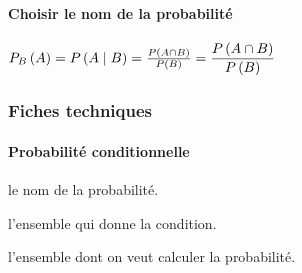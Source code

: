 \documentclass[12pt,a4paper]{article}
\begin{document}
\paragraph{Choisir le nom de la probabilité}

\begin{latexex}
$\probacond[P]{B}{A}
 =
 \probacond*[P]{B}{A}
 =
 \probacond**[P]{B}{A}
 =
 \dprobacond**[P]{B}{A}$
\end{latexex}




\subsubsection{Fiches techniques}

\paragraph{Probabilité conditionnelle}





\IDoption{} le nom de la probabilité.

 l'ensemble qui donne la condition.

 l'ensemble dont on veut calculer la probabilité.
\end{document}
